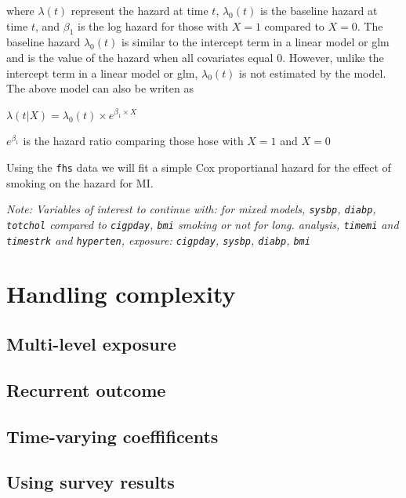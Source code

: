 \documentclass[
]{book}
\begin{document}
where \(\lambda(t)\) represent the hazard at time \(t\), \(\lambda_{0}(t)\) is the baseline hazard at time \(t\), and \(\beta_{1}\) is the log hazard for those with \(X=1\) compared to \(X=0\). The baseline hazard \(\lambda_{0}(t)\) is similar to the intercept term in a linear model or glm and is the value of the hazard when all covariates equal 0. However, unlike the intercept term in a linear model or glm, \(\lambda_{0}(t)\) is not estimated by the model.
The above model can also be writen as

\(\lambda(t|X)=\lambda_{0}(t)\times e^{\beta_{1}\times X}\)

\(e^{\beta_{1}}\) is the hazard ratio comparing those hose with \(X=1\) and \(X=0\)

Using the \texttt{fhs} data we will fit a simple Cox proportianal hazard for the effect of smoking on the hazard for MI.

\emph{Note: Variables of interest to continue with:
for mixed models, \texttt{sysbp}, \texttt{diabp}, \texttt{totchol} compared to \texttt{cigpday}, \texttt{bmi} smoking or not
for long. analysis, \texttt{timemi} and \texttt{timestrk} and \texttt{hyperten}, exposure: \texttt{cigpday}, \texttt{sysbp}, \texttt{diabp}, \texttt{bmi}}

\hypertarget{handling-complexity}{%
\section{Handling complexity}\label{handling-complexity}}

\hypertarget{multi-level-exposure}{%
\subsection{Multi-level exposure}\label{multi-level-exposure}}

\hypertarget{recurrent-outcome}{%
\subsection{Recurrent outcome}\label{recurrent-outcome}}

\hypertarget{time-varying-coeffificents}{%
\subsection{Time-varying coeffificents}\label{time-varying-coeffificents}}

\hypertarget{using-survey-results}{%
\subsection{Using survey results}\label{using-survey-results}}
\end{document}
